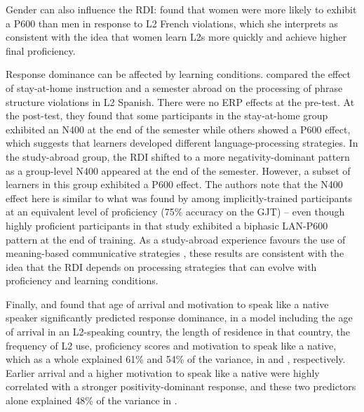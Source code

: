 \documentclass[output=paper,colorlinks,citecolor=brown,modfonts,nonflat]{../langscibook}
\begin{document}
Gender can also influence the RDI: \citet{Wampler2017} found that women were more likely to exhibit a P600 than men in response to L2 French violations, which she interprets as consistent with the idea that women learn L2s more quickly and achieve higher final proficiency. 

Response dominance can be affected by learning conditions. \citet{Faretta-StutenbergMorgan-Short2018} compared the effect of stay-at-home instruction and a semester abroad on the processing of phrase structure violations in L2 Spanish. There were no ERP effects at the pre-test. At the post-test, they found that some participants in the stay-at-home group exhibited an N400 at the end of the semester while others showed a P600 effect, which suggests that learners developed different language-processing strategies. In the study-abroad group, the RDI shifted to a more negativity-dominant pattern as a group-level N400 appeared at the end of the semester. However, a subset of learners in this group exhibited a P600 effect. The authors note that the N400 effect here is similar to what was found by \citet{Morgan-ShortEtAl2010} among implicitly-trained participants at an equivalent level of proficiency (75\% accuracy on the GJT) – even though highly proficient participants in that study exhibited a biphasic LAN-P600 pattern at the end of training. As a study-abroad experience favours the use of meaning-based communicative strategies \citep{TokowiczEtAl2004}, these results are consistent with the idea that the RDI depends on processing strategies that can evolve with proficiency and learning conditions.

Finally, \citet{TannerEtAl2012} and \citet{TannerEtAl2014} found that age of arrival and motivation to speak like a native speaker significantly predicted response dominance, in a model including the age of arrival in an L2-speaking country, the length of residence in that country, the frequency of L2 use, proficiency scores and motivation to speak like a native, which as a whole explained 61\% and 54\% of the variance, in \citet{TannerEtAl2012} and \citet{TannerEtAl2014}, respectively. Earlier arrival and a higher motivation to speak like a native were highly correlated with a stronger positivity-dominant response, and these two predictors alone explained 48\% of the variance in \citet{TannerEtAl2014}.
\end{document}
